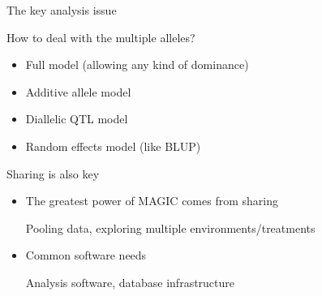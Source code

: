 \documentclass[12pt]{article}
\newcommand{\headsize}{\fontsize{35}{35} \selectfont}
\newcommand{\smallsize}{\fontsize{25}{30} \selectfont}
\newcommand{\smallersize}{\fontsize{20}{25} \selectfont}
\begin{document}
{\newpage


\headsize \color{myyellow}
\hfill \begin{minipage}{5.75in}
\centering
The key analysis issue
\end{minipage}

\vspace{25mm}

\color{mywhite}
\smallsize

\hfill \begin{minipage}{9.5in}
How to deal with the multiple alleles?
\end{minipage}

\vspace{15mm}

\hfill \begin{minipage}{9in}
\color{myblue} \smallersize
\begin{itemize}
\itemsep24pt
\item Full model (allowing any kind of dominance)
\item Additive allele model
\item Diallelic QTL model
\item Random effects model (like BLUP)

\end{itemize}
\end{minipage}



\newpage


\headsize \color{myyellow}
\hfill \begin{minipage}{5.75in}
\centering
Sharing is also key
\end{minipage}

\vspace{25mm}

\color{mywhite}
\smallsize

 \hfill \begin{minipage}{10in}
 \begin{itemize}
 \itemsep24pt
 \item The greatest power of MAGIC comes from sharing

   {\smallersize \color{myblue} Pooling data, exploring multiple environments/treatments}

 \item Common software needs

   {\smallersize \color{myblue} Analysis software, database infrastructure}


\end{itemize}
\end{minipage}}
\end{document}
